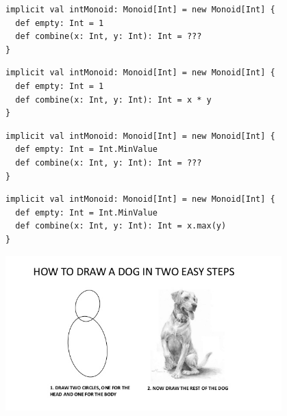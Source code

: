 \documentclass[aspectratio=169]{beamer}
\begin{document}
\begin{frame}
  \begin{verbatim}
implicit val intMonoid: Monoid[Int] = new Monoid[Int] {
  def empty: Int = 1
  def combine(x: Int, y: Int): Int = ???
}
  \end{verbatim}
\end{frame}

\begin{frame}
  \begin{verbatim}
implicit val intMonoid: Monoid[Int] = new Monoid[Int] {
  def empty: Int = 1
  def combine(x: Int, y: Int): Int = x * y
}
  \end{verbatim}
\end{frame}

\begin{frame}
  \begin{verbatim}
implicit val intMonoid: Monoid[Int] = new Monoid[Int] {
  def empty: Int = Int.MinValue
  def combine(x: Int, y: Int): Int = ???
}
  \end{verbatim}
\end{frame}

\begin{frame}
  \begin{verbatim}
implicit val intMonoid: Monoid[Int] = new Monoid[Int] {
  def empty: Int = Int.MinValue
  def combine(x: Int, y: Int): Int = x.max(y)
}
  \end{verbatim}
\end{frame}

\begin{frame}[fragile]
  \begin{center}
    \includegraphics[width=0.8\textwidth]{static-images/draw-dog.jpg}
  \end{center}
\end{frame}
\end{document}
